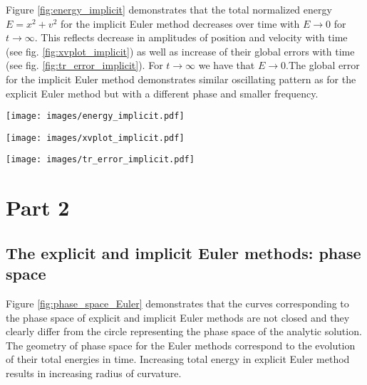 \documentclass{article}
\newenvironment{Figure}
  {\par\medskip\noindent\minipage{\linewidth}}
  {\endminipage\par\medskip}
\begin{document}
Figure \ref{fig:energy_implicit} demonstrates that the total normalized energy $E = x^2 + v^2$ for the implicit Euler method decreases over time with $E \to 0 $ for $t \to \infty $. This reflects decrease in amplitudes of position and velocity with time (see fig. \ref{fig:xvplot_implicit}) as well as increase of their global errors with time (see fig. \ref{fig:tr_error_implicit}). For $t \to \infty $ we have that $E \to 0$.The global error for the implicit Euler method demonstrates similar oscillating pattern as for the explicit Euler method but with a different phase and smaller frequency.

\begin{Figure}
\centering
\texttt{[image: images/energy\_implicit.pdf]}
\label{fig:energy_implicit}
\end{Figure}

\begin{Figure}
\centering
\texttt{[image: images/xvplot\_implicit.pdf]}
\label{fig:xvplot_implicit}
\end{Figure}

\begin{Figure}
\centering
\texttt{[image: images/tr\_error\_implicit.pdf]}
\label{fig:tr_error_implicit}
\end{Figure}

\section{Part 2}
\subsection{The explicit and implicit Euler methods: phase space}

Figure \ref{fig:phase_space_Euler} demonstrates that the curves corresponding to the phase space of explicit and implicit Euler methods are not closed and they clearly differ from the circle representing the phase space of the analytic solution. The geometry of phase space for the Euler methods correspond to the evolution of their total energies in time. Increasing total energy in explicit Euler method results in increasing radius of curvature.
\end{document}

